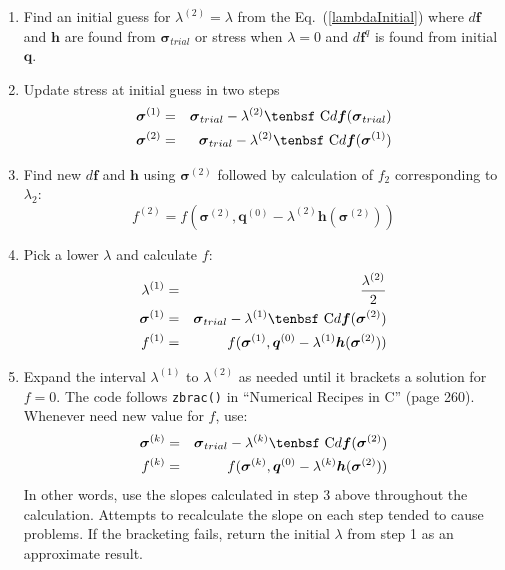 \documentclass[11pt]{article}
\renewcommand{\vec}[1]{\boldsymbol{#1}}
\def\C{\hbox{\tenbsf C}}
\def\df{d \vec{f}}
\def\dfq{d \vec{f}^q}
\begin{document}
\begin{enumerate}

\item Find an initial guess for $\lambda^{(2)}=\lambda$ from the Eq.~(\ref{lambdaInitial}) where $\df$ and $\vec h$ are found from ${\vec\sigma_{trial}}$ or stress when $\lambda=0$ and $\dfq$ is found from initial $\vec q$.

\item Update stress at initial guess in two steps
\begin{eqnarray}
      {\vec\sigma}^{(1)} & = & {\vec\sigma_{trial}} - \lambda^{(2)}\C\df({\vec\sigma_{trial}}) \\
      {\vec\sigma}^{(2)} & = & {\vec\sigma_{trial}} - \lambda^{(2)}\C\df({\vec\sigma}^{(1)}) 
\end{eqnarray}

\item Find new $\df$ and $\vec h$ using ${\vec\sigma}^{(2)}$ followed by calculation of $f_2$ corresponding to $\lambda_2$:
\begin{equation}
     f^{(2)} =  f({\vec\sigma}^{(2)},\vec q^{(0)} - \lambda^{(2)} \vec h({\vec\sigma}^{(2)}))
\end{equation}

\item Pick a lower $\lambda$ and calculate $f$:
\begin{eqnarray}
     \lambda^{(1)} & = & {\lambda^{(2)}\over 2} \\
      {\vec\sigma}^{(1)} & = & {\vec\sigma_{trial}} - \lambda^{(1)}\C\df({\vec\sigma}^{(2)}) \\
     f^{(1)} & = &  f({\vec\sigma}^{(1)},\vec q^{(0)} - \lambda^{(1)} \vec h({\vec\sigma}^{(2)}))
\end{eqnarray}

\item Expand the interval $\lambda^{(1)}$ to $\lambda^{(2)}$ as needed until it brackets a solution for $f=0$. The code follows {\tt zbrac()} in ``Numerical Recipes in C'' (page 260). Whenever need new value for $f$, use:
\begin{eqnarray}
      {\vec\sigma}^{(k)} & = & {\vec\sigma_{trial}} - \lambda^{(k)}\C\df({\vec\sigma}^{(2)}) \\
     f^{(k)} & = &  f({\vec\sigma}^{(k)},\vec q^{(0)} - \lambda^{(k)} \vec h({\vec\sigma}^{(2)}))
\end{eqnarray}
In other words, use the slopes calculated in step 3 above throughout the calculation. Attempts to recalculate the slope on each step tended to cause problems. If the bracketing fails, return the initial $\lambda$ from step 1 as an approximate result.


\end{enumerate}
\end{document}
